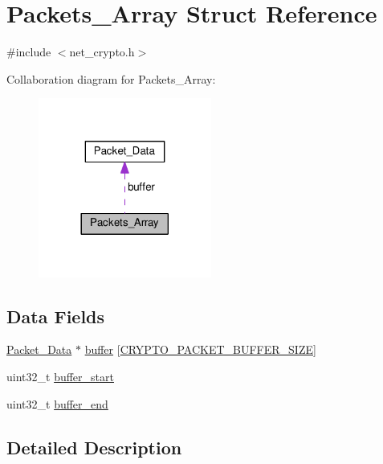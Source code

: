 \hypertarget{struct_packets___array}{\section{Packets\+\_\+\+Array Struct Reference}
\label{struct_packets___array}
}


{\ttfamily \#include $<$net\+\_\+crypto.\+h$>$}



Collaboration diagram for Packets\+\_\+\+Array\+:
\nopagebreak
\begin{figure}[H]
\begin{center}
\leavevmode
\includegraphics[width=161pt]{d9/d97/struct_packets___array__coll__graph}
\end{center}
\end{figure}
\subsection*{Data Fields}
\begin{DoxyCompactItemize}
\item 
\hyperlink{struct_packet___data}{Packet\+\_\+\+Data} $\ast$ \hyperlink{struct_packets___array_ae9d4e6271fdb80e86ebb3e846fcd709c}{buffer} \mbox{[}\hyperlink{net__crypto_8h_ac73cf1eb0a938f0962ddc607945636f4}{C\+R\+Y\+P\+T\+O\+\_\+\+P\+A\+C\+K\+E\+T\+\_\+\+B\+U\+F\+F\+E\+R\+\_\+\+S\+I\+Z\+E}\mbox{]}
\item 
uint32\+\_\+t \hyperlink{struct_packets___array_a85973b335814248c05f63543876b348e}{buffer\+\_\+start}
\item 
uint32\+\_\+t \hyperlink{struct_packets___array_a66d710e0093872b26ee80118c1a85d99}{buffer\+\_\+end}
\end{DoxyCompactItemize}


\subsection{Detailed Description}


